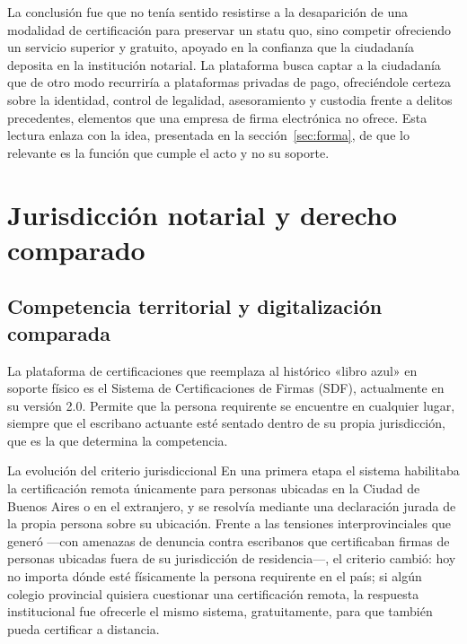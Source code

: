 \documentclass[12pt,oneside]{book}
\begin{document}
La conclusión fue que no tenía sentido resistirse a la desaparición de una modalidad de certificación para preservar un statu quo, sino competir ofreciendo un servicio superior y gratuito, apoyado en la confianza que la ciudadanía deposita en la institución notarial. La plataforma busca captar a la ciudadanía que de otro modo recurriría a plataformas privadas de pago, ofreciéndole certeza sobre la identidad, control de legalidad, asesoramiento y custodia frente a delitos precedentes, elementos que una empresa de firma electrónica no ofrece. Esta lectura enlaza con la idea, presentada en la sección~\ref{sec:forma}, de que lo relevante es la función que cumple el acto y no su soporte.

\section{Jurisdicción notarial y derecho comparado}

\subsection{Competencia territorial y digitalización comparada}

La plataforma de certificaciones que reemplaza al histórico «libro azul» en soporte físico es el Sistema de Certificaciones de Firmas (SDF), actualmente en su versión 2.0. Permite que la persona requirente se encuentre en cualquier lugar, siempre que el escribano actuante esté sentado dentro de su propia jurisdicción, que es la que determina la competencia.

\begin{example}{La evolución del criterio jurisdiccional}
En una primera etapa el sistema habilitaba la certificación remota únicamente para personas ubicadas en la Ciudad de Buenos Aires o en el extranjero, y se resolvía mediante una declaración jurada de la propia persona sobre su ubicación. Frente a las tensiones interprovinciales que generó ---con amenazas de denuncia contra escribanos que certificaban firmas de personas ubicadas fuera de su jurisdicción de residencia---, el criterio cambió: hoy no importa dónde esté físicamente la persona requirente en el país; si algún colegio provincial quisiera cuestionar una certificación remota, la respuesta institucional fue ofrecerle el mismo sistema, gratuitamente, para que también pueda certificar a distancia.
\end{example}
\end{document}
